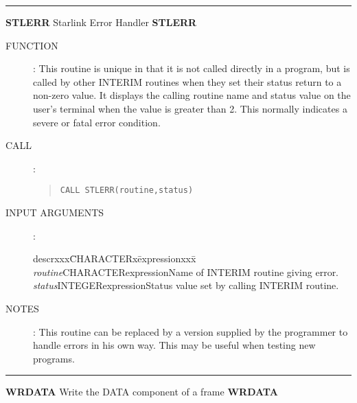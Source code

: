 \rule{\textwidth}{0.3mm}
{\Large {\bf STLERR} \hfill Starlink Error Handler \hfill {\bf STLERR}}
\begin{description}
\item [FUNCTION]:
This routine is unique in that it is not called directly in a program, but is
called by other INTERIM routines when they set their status return to a
non-zero value.
It displays the calling routine name and status value on the user's terminal
when the value is greater than 2.
This normally indicates a severe or fatal error condition.
\item [CALL]:
\begin{quote}
{\tt CALL STLERR(routine,status)}
\end{quote}
\item [INPUT ARGUMENTS]:
\begin{tabbing}
descrxxx\=CHARACTERx\=expressionxxx\=\kill
{\em routine}\>CHARACTER\>expression\>Name of INTERIM routine giving error.\\
{\em status}\>INTEGER\>expression\>Status value set by calling INTERIM routine.
\end{tabbing}
\item [NOTES]:
This routine can be replaced by a version supplied by the programmer to handle
errors in his own way.
This may be useful when testing new programs.
\end{description}
\rule{\textwidth}{0.3mm}
{\Large {\bf WRDATA} \hfill Write the DATA component of a frame \hfill {\bf WRDATA}}
